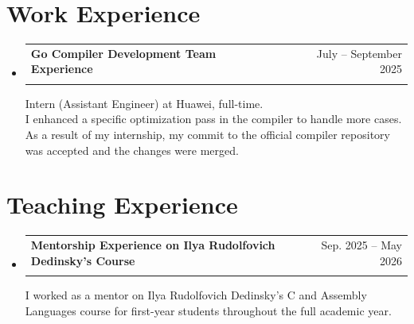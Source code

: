 \documentclass[A4,11pt]{article}
\makeatletter
\newcommand{\CVSubheading}[4]{
  \vspace{-2pt}\item
    \begin{tabular*}{0.97\textwidth}[t]{l@{\extracolsep{\fill}}r}
      \textbf{#1} & #2 \\
      \small#3 & \small #4 \\
    \end{tabular*}\vspace{-7pt}
}
\newcommand{\CVSubHeadingListStart}{\begin{itemize}[leftmargin=0.5cm, label={}]}
\newcommand{\CVSubHeadingListEnd}{\end{itemize}}
\makeatother
\begin{document}
\section{Work Experience}
  \CVSubHeadingListStart
    \CVSubheading
      {Go Compiler Development Team Experience}{July -- September 2025}
      {}{}
      \small{Intern (Assistant Engineer) at Huawei, full-time. \\ I enhanced a specific optimization pass in the compiler to handle more cases. As a result of my internship, my commit to the official compiler repository was accepted and the changes were merged.}
  \CVSubHeadingListEnd

\section{Teaching Experience}
  \CVSubHeadingListStart
    \CVSubheading
      {Mentorship Experience on Ilya Rudolfovich Dedinsky's Course}{Sep. 2025 -- May 2026}
      {}{}
      \small{I worked as a mentor on Ilya Rudolfovich Dedinsky's C and Assembly Languages course for first-year students throughout the full academic year.}
  \CVSubHeadingListEnd

\end{document}
